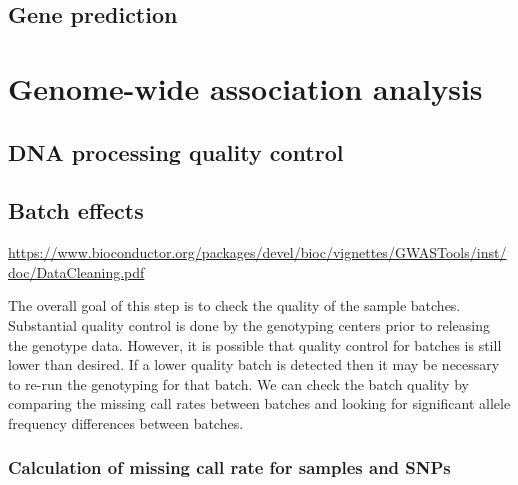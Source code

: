 \documentclass[]{book}
\theoremstyle{definition}
\theoremstyle{definition}
\theoremstyle{definition}
\theoremstyle{remark}
\begin{document}
\section{Gene prediction}\label{gene-prediction}

\chapter{Genome-wide association
analysis}\label{genome-wide-association-analysis}

\section{DNA processing quality
control}\label{dna-processing-quality-control}

\section{Batch effects}\label{batch-effects}

\url{https://www.bioconductor.org/packages/devel/bioc/vignettes/GWASTools/inst/doc/DataCleaning.pdf}

The overall goal of this step is to check the quality of the sample
batches. Substantial quality control is done by the genotyping centers
prior to releasing the genotype data. However, it is possible that
quality control for batches is still lower than desired. If a lower
quality batch is detected then it may be necessary to re-run the
genotyping for that batch. We can check the batch quality by comparing
the missing call rates between batches and looking for significant
allele frequency differences between batches.

\subsection{Calculation of missing call rate for samples and
SNPs}\label{calculation-of-missing-call-rate-for-samples-and-snps}
\end{document}
